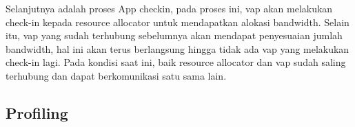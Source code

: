        Selanjutnya adalah proses App checkin, pada proses ini, \gls{vap} akan melakukan check-in kepada resource allocator untuk mendapatkan alokasi bandwidth. Selain itu, \gls{vap}
        yang sudah terhubung sebelumnya akan mendapat penyesuaian jumlah bandwidth, hal ini akan terus berlangsung hingga tidak ada \gls{vap} yang melakukan check-in lagi.
        Pada kondisi saat ini, baik resource allocator dan \gls{vap} sudah saling terhubung dan dapat berkomunikasi satu sama lain.

    \subsection{Profiling}



